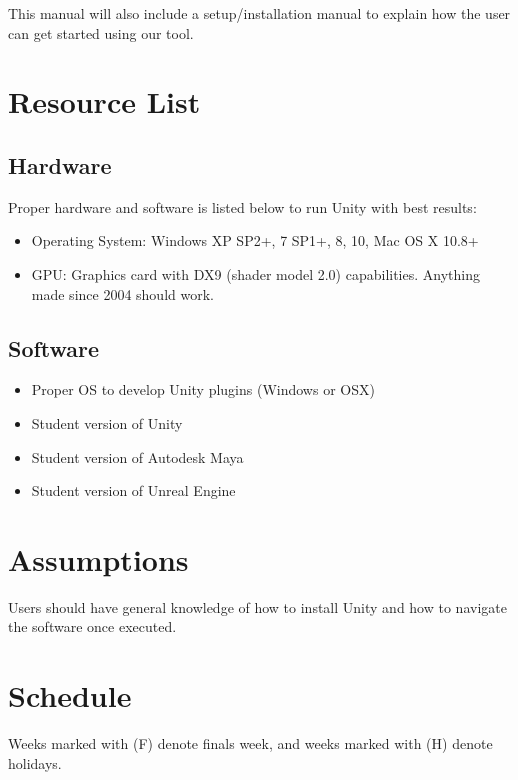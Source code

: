 \documentclass[12pt]{article}
\begin{document}
This manual will also include a setup/installation manual to explain how the user can get started using our tool.

\section{Resource List}
\label{sec:resource}
\subsection{Hardware}
Proper hardware and software is listed below to run Unity with best results:
\begin{itemize}
 \item Operating System: Windows XP SP2+, 7 SP1+, 8, 10, Mac OS X 10.8+
 \item GPU: Graphics card with DX9 (shader model 2.0) capabilities. Anything made since 2004 should work.
\end{itemize}

\subsection{Software}
\begin{itemize}
 \item Proper OS to develop Unity plugins (Windows or OSX)
 \item Student version of Unity
 \item Student version of Autodesk Maya
 \item Student version of Unreal Engine
\end{itemize}

\section{Assumptions}
\label{sec:assumptions}
Users should have general knowledge of how to install Unity and how to navigate the software once executed.

\section{Schedule}
\label{sec:schedule}
Weeks marked with (F) denote finals week, and weeks marked with (H) denote holidays.
\end{document}
